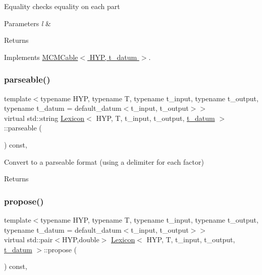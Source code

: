 Equality checks equality on each part 
\begin{DoxyParams}{Parameters}
{\em l} & \\
\hline
\end{DoxyParams}
\begin{DoxyReturn}{Returns}

\end{DoxyReturn}


Implements \hyperlink{class_m_c_m_cable_aa73001ec3bb0cf0c618281dfa998f2f1}{M\+C\+M\+Cable$<$ H\+Y\+P, t\+\_\+datum $>$}.

\mbox{\label{class_lexicon_a8eda74c4e7500b31a382c182ac60436a}} 
\subsubsection{\texorpdfstring{parseable()}{parseable()}}
{\footnotesize\ttfamily template$<$typename H\+YP, typename T, typename t\+\_\+input, typename t\+\_\+output, typename t\+\_\+datum = default\+\_\+datum$<$t\+\_\+input, t\+\_\+output$>$$>$ \\
virtual std\+::string \hyperlink{class_lexicon}{Lexicon}$<$ H\+YP, T, t\+\_\+input, t\+\_\+output, \hyperlink{class_bayesable_a7c93a2eeab708378eb321745908718d4}{t\+\_\+datum} $>$\+::parseable (\begin{DoxyParamCaption}{ }\end{DoxyParamCaption}) const\hspace{0.3cm}{\ttfamily [inline]}, {\ttfamily [virtual]}}

Convert to a parseable format (using a delimiter for each factor) \begin{DoxyReturn}{Returns}

\end{DoxyReturn}
\mbox{\label{class_lexicon_a41a1955c8d373e85c3b926f161bf7e31}} 
\subsubsection{\texorpdfstring{propose()}{propose()}}
{\footnotesize\ttfamily template$<$typename H\+YP, typename T, typename t\+\_\+input, typename t\+\_\+output, typename t\+\_\+datum = default\+\_\+datum$<$t\+\_\+input, t\+\_\+output$>$$>$ \\
virtual std\+::pair$<$H\+YP,double$>$ \hyperlink{class_lexicon}{Lexicon}$<$ H\+YP, T, t\+\_\+input, t\+\_\+output, \hyperlink{class_bayesable_a7c93a2eeab708378eb321745908718d4}{t\+\_\+datum} $>$\+::propose (\begin{DoxyParamCaption}{ }\end{DoxyParamCaption}) const\hspace{0.3cm}{\ttfamily [inline]}, {\ttfamily [virtual]}}

